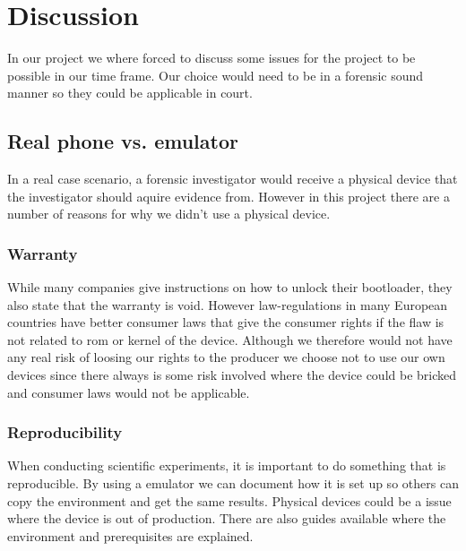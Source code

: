 \section{Discussion}
In our project we where forced to discuss some issues for the project to be 
possible in our time frame. Our choice would need to be in a forensic sound manner 
so they could be applicable in court. 

\subsection{Real phone vs. emulator}
In a real case scenario, a forensic investigator would receive a physical device 
that the investigator should aquire evidence from. However in this project there 
are a number of reasons for why we didn't use a physical device.

\subsubsection{Warranty}
While many companies give instructions on how to unlock their bootloader, they also 
state that the warranty is void. However law-regulations in many European countries 
have better consumer laws that give the consumer rights if the flaw %
is not related to rom or kernel of the device. Although we therefore would not have 
any real risk of loosing our rights to the producer we choose not to use our own 
devices since there always is some risk involved where the device could be bricked 
and consumer laws would not be applicable.

\subsubsection{Reproducibility}
When conducting scientific experiments, it is important to do something that is 
reproducible. By using a emulator we can document how it is set up so others can 
copy the environment and get the same results. Physical devices could be a issue 
where the device is out of production. There are also guides available where the 
environment and prerequisites are explained.

